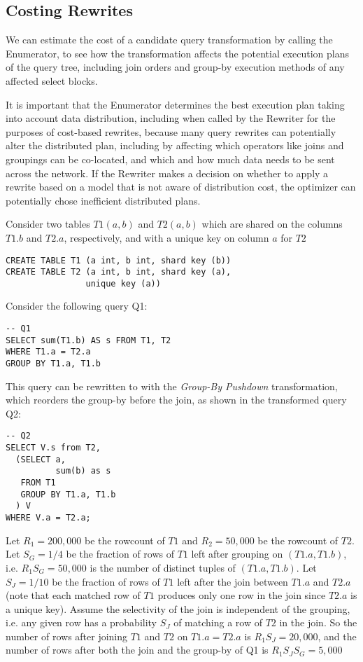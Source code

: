 \documentclass[11pt]{article}
\begin{document}
\subsection{Costing Rewrites}
\label{sec:org72be1f6}
We can estimate the cost of a candidate query transformation by calling the Enumerator, to see how the
transformation affects the potential execution plans of the query tree, including join orders and
group-by execution methods of any affected select blocks.

It is important that the Enumerator determines the best execution plan taking into account data
distribution, including when called by the Rewriter for the purposes of cost-based rewrites, because
many query rewrites can potentially alter the distributed plan, including by affecting which operators
like joins and groupings can be co-located, and which and how much data needs to be sent across the
network. If the Rewriter makes a decision on whether to apply a rewrite based on a model that is not
aware of distribution cost, the optimizer can potentially chose inefficient distributed plans.

Consider two tables \(T1(a,b)\) and \(T2(a,b)\) which are shared on the columns \(T1.b\) and \(T2.a\),
respectively, and with a unique key on column \(a\) for \(T2\)

\begin{verbatim}
CREATE TABLE T1 (a int, b int, shard key (b))
CREATE TABLE T2 (a int, b int, shard key (a),
                unique key (a))
\end{verbatim}

Consider the following query Q1:
\begin{verbatim}
-- Q1
SELECT sum(T1.b) AS s FROM T1, T2
WHERE T1.a = T2.a
GROUP BY T1.a, T1.b
\end{verbatim}
This query can be rewritten to with the \emph{Group-By Pushdown} transformation, which reorders the group-by
before the join, as shown in the transformed query Q2:
\begin{verbatim}
-- Q2
SELECT V.s from T2,
  (SELECT a,
          sum(b) as s
   FROM T1
   GROUP BY T1.a, T1.b
  ) V
WHERE V.a = T2.a;
\end{verbatim}

Let \(R_1=200,000\) be the rowcount of \(T1\) and \(R_2=50,000\) be the rowcount of \(T2\). Let
\(S_G=1/4\) be the fraction of rows of \(T1\) left after grouping on \((T1.a, T1.b)\), i.e.
\(R_1S_G=50,000\) is the number of distinct tuples of \((T1.a, T1.b)\). Let \(S_J=1/10\) be the fraction
of rows of \(T1\) left after the join between \(T1.a\) and \(T2.a\) (note that each matched row of
\(T1\) produces only one row in the join since \(T2.a\) is a unique key). Assume the selectivity of
the join is independent of the grouping, i.e. any given row has a probability \(S_J\) of matching a
row of \(T2\) in the join. So the number of rows after joining \(T1\) and \(T2\) on \(T1.a = T2.a\) is
\(R_1S_J=20,000\), and the number of rows after both the join and the group-by of Q1 is
\(R_1S_JS_G=5,000\)
\end{document}
